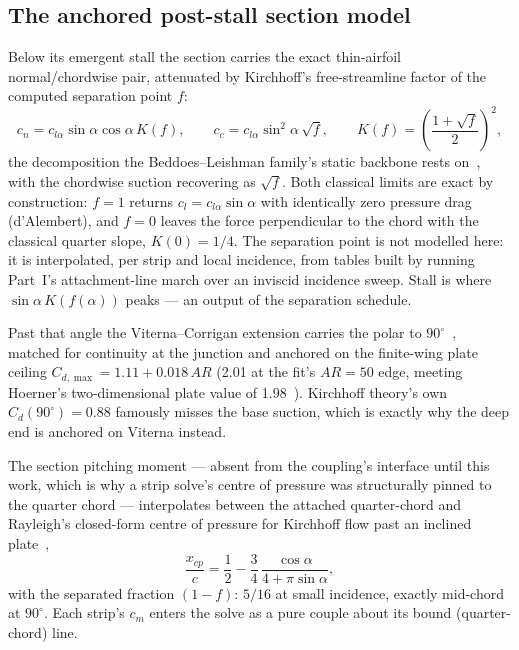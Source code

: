 \documentclass[submit]{aiaa-tc}
\begin{document}
\subsection{The anchored post-stall section model}

Below its emergent stall the section carries the exact thin-airfoil
normal/chordwise pair, attenuated by Kirchhoff's free-streamline factor
of the computed separation point $f$:
%
\begin{equation}
  \label{eq:kirchhoff}
  c_n = c_{l\alpha}\sin\alpha\cos\alpha\,K(f), \qquad
  c_c = c_{l\alpha}\sin^2\!\alpha\,\sqrt{f}, \qquad
  K(f) = \left(\frac{1+\sqrt{f}}{2}\right)^{\!2},
\end{equation}
%
the decomposition the Beddoes--Leishman family's static backbone rests
on~\cite{leishman2006rotor}, with the chordwise suction recovering as
$\sqrt{f}$. Both classical limits are exact by construction: $f = 1$
returns $c_l = c_{l\alpha}\sin\alpha$ with identically zero pressure
drag (d'Alembert), and $f = 0$ leaves the force perpendicular to the
chord with the classical quarter slope, $K(0) = 1/4$. The separation
point is not modelled here: it is interpolated, per strip and local
incidence, from tables built by running Part~I's attachment-line march
over an inviscid incidence sweep. Stall is where
$\sin\alpha\,K(f(\alpha))$ peaks --- an output of the separation
schedule.

Past that angle the Viterna--Corrigan extension carries the polar to
$90^\circ$~\cite{viternaCorrigan1982}, matched for continuity at the
junction and anchored on the finite-wing plate ceiling $C_{d,\max} =
1.11 + 0.018\,A\!R$ (2.01 at the fit's $A\!R = 50$ edge, meeting
Hoerner's two-dimensional plate value of
1.98~\cite{hoerner1965fluiddynamicdrag}). Kirchhoff theory's own
$C_d(90^\circ) = 0.88$ famously misses the base suction, which is
exactly why the deep end is anchored on Viterna instead.

The section pitching moment --- absent from the coupling's interface
until this work, which is why a strip solve's centre of pressure was
structurally pinned to the quarter chord --- interpolates between the
attached quarter-chord and Rayleigh's closed-form centre of pressure for
Kirchhoff flow past an inclined plate~\cite{rayleigh1876},
%
\begin{equation}
  \label{eq:rayleigh}
  \frac{x_{cp}}{c} = \frac{1}{2}
    - \frac{3}{4}\,\frac{\cos\alpha}{4 + \pi\sin\alpha} ,
\end{equation}
%
with the separated fraction $(1-f)$: $5/16$ at small incidence, exactly
mid-chord at $90^\circ$. Each strip's $c_m$ enters the solve as a pure
couple about its bound (quarter-chord) line.
\end{document}

